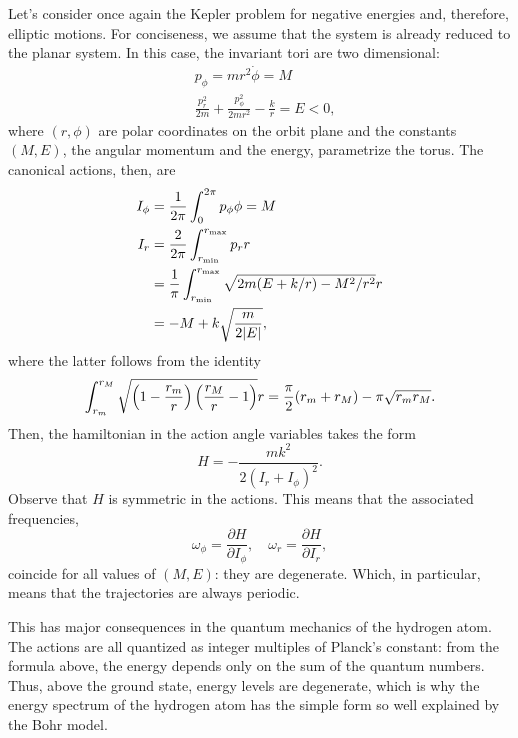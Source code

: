 \documentclass[english,fontsize=11pt,paper=a5,oneside]{scrbook}
\let\d\relax
\DeclareMathOperator{\d}{d}
\theoremstyle{definition}
\newenvironment{example}
  {\pushQED{\qed}\renewcommand{\qedsymbol}{$\lozenge$}\examplex}
  {\popQED\endexamplex}
\begin{document}
\begin{example}[Kepler problem -- elliptic motion]
    Let's consider once again the Kepler problem for negative energies and, therefore, elliptic motions.
    For conciseness, we assume that the system is already reduced to the planar system. In this case, the invariant tori are two dimensional:
    \begin{align}
        &p_\phi = m r^2 \dot \phi = M \\
        & \frac{p_r^2}{2 m} + \frac{p_\phi^2}{2 m r^2} - \frac{k}{r} = E <0,
    \end{align}
    where $(r,\phi)$ are polar coordinates on the orbit plane and the constants $(M,E)$, the angular momentum and the energy, parametrize the torus.
    The canonical actions, then, are
    \begin{align}
        I_\phi &= \frac{1}{2\pi} \int_0^{2\pi} p_\phi \d \phi = M\\
        I_r &= \frac{2}{2\pi} \int_{r_{\mathrm{min}}}^{r_{\mathrm{max}}} p_r \d r\\
           &= \frac1\pi \int_{r_{\mathrm{min}}}^{r_{\mathrm{max}}} \sqrt{2m(E + k/r) - M^2/r^2}\d r \\
           &= - M + k \sqrt{\frac{m}{2|E|}},
    \end{align}
    where the latter follows from the identity
    \begin{equation}
        \int_{r_{m}}^{r_{M}} \sqrt{\left(1-\frac{r_m}r\right)\left(\frac{r_M}r-1\right)}\d r = \frac{\pi}2(r_m + r_M) - \pi \sqrt{r_m r_M}.
    \end{equation}
    Then, the hamiltonian in the action angle variables takes the form
    \begin{equation}
        H = - \frac{mk^2}{2(I_r + I_\phi)^2}.
    \end{equation}
    Observe that $H$ is symmetric in the actions. This means that the associated frequencies,
    \begin{equation}
        \omega_\phi = \frac{\partial H}{\partial I_\phi}, \quad
        \omega_r = \frac{\partial H}{\partial I_r},
    \end{equation}
    coincide for all values of $(M,E)$: they are degenerate. Which, in particular, means that the trajectories are always periodic.

    This has major consequences in the quantum mechanics of the hydrogen atom. The actions are all quantized as integer multiples of Planck's constant: from the formula above, the energy depends only on the sum of the quantum numbers. Thus, above the ground state, energy levels are degenerate, which is why the energy spectrum of the hydrogen atom has the simple form so well explained by the Bohr model.


\end{example}
\end{document}
